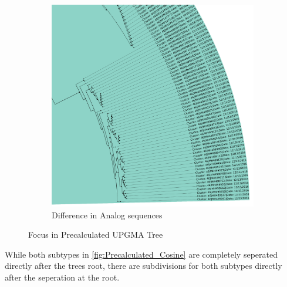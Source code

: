 \begin{figure}[!hbt]
\begin{subfigure}[t]{0.475\textwidth}
    \end{subfigure}
    \hfill
    \begin{subfigure}[t]{0.475\textwidth}
        \caption{Difference in Analog sequences}
        \label{subfig:identical}
        \includegraphics[width=\textwidth]{Graphics/identical.pdf}
    \end{subfigure}
    \caption[Focus in Precalculated \Acrshort{UPGMA} Tree]{Focus in Precalculated \Acrshort{UPGMA} Tree}
    \label{fig:focus}
\end{figure}

While both subtypes in \autoref{fig:Precalculated_Cosine} are completely seperated directly after the trees root, there are subdivisions for both subtypes directly after the seperation at the root. 

